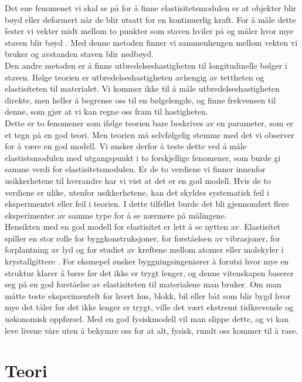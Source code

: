 \documentclass[%
 reprint,
 amsmath,amssymb,
 aps,
 norsk,
 booktabs
]{revtex4-1}
\begin{document}
Det ene fenomenet vi skal se på for å finne elastisitetsmodulen er at objekter blir bøyd eller deformert når de blir utsatt for en kontinuerlig kraft. For å måle dette fester vi vekter midt mellom to punkter som staven hviler på og måler hvor mye staven blir bøyd . Med denne metoden finner vi sammenhengen mellom vekten vi bruker og avstanden staven blir nedbøyd.\\
Den andre metoden er å finne utbredelseshastigheten til longitudinelle bølger i staven. Ifølge teorien er utbredelseshastigheten avhengig av tettheten og elastisiteten til materialet. Vi kommer ikke til å måle utbredelseshastigheten direkte, men heller å begrense oss til en bølgelengde, og finne frekvensen til denne, som gjør at vi kan regne oss fram til hastigheten.\\
Dette er to fenomener som ifølge teorien bare beskrives av en parameter, som er et tegn på en god teori. Men teorien må selvfølgelig stemme med det vi observer for å være en god modell. Vi ønsker derfor å teste dette ved å måle elastistsmodulen med utgangspunkt i to forskjellige fenomener, som burde gi samme verdi for elastisitetsmodulen. Er de to verdiene vi finner innenfor usikkerhetene til hverandre har vi vist at det er en god modell. Hvis de to verdiene er ulike, utenfor usikkerhetene, kan det skyldes systematisk feil i eksperimentet eller feil i teorien. I dette tilfellet burde det bli gjennomført flere eksperimenter av samme type for å se nærmere på målingene.\\
Hensikten med en god modell for elastisitet er lett å se nytten av. Elastisitet spiller en stor rolle for byggkonstruksjoner, for forståelsen av vibrasjoner, for forplantning av lyd og for studiet av kreftene mellom atomer eller molekyler i krystallgittere \cite{gronn}. For eksmepel ønsker byggningsingeniører å forutsi hvor mye en struktur klarer å bære før det ikke er trygt lenger, og denne vitenskapen baserer seg på en god forståelse av elastisiteten til materialene man bruker. Om man måtte teste eksperimentelt for hvert hus, blokk, bil eller båt som blir bygd hvor mye det tåler før det ikke lenger er trygt, ville det vært ekstremt tidkrevende og uøkonomisk oppførsel. Med en god fysiskmodell vil man slippe dette, og vi kan leve livene våre uten å bekymre oss for at alt, fysisk, rundt oss kommer til å rase.
\section{Teori}
\end{document}

